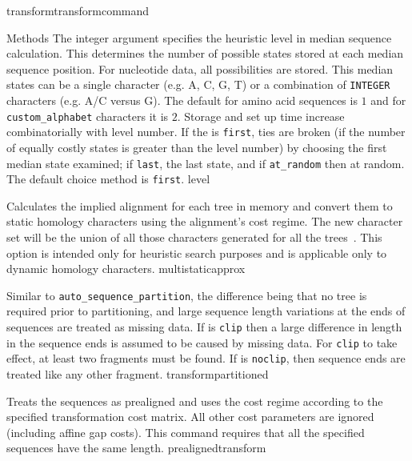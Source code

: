 \begin{command}{transform}{transformcommand}
\begin{arguments}
\begin{argumentgroup}{Methods}
          {The integer argument specifies the heuristic level in median sequence calculation.  
            This determines the number of possible states stored at each median sequence position.  
            For nucleotide data, all possibilities are stored.  This median states can be a single character 
            (e.g. A, C, G, T) or a combination of \texttt{INTEGER}  characters (e.g. A/C versus G).
            The default for amino acid sequences is $1$ and for \texttt{custom\_alphabet} characters 
            it is $2$.  Storage and set up time increase combinatorially with level number. 
            If the \poylident is \texttt{first}, ties are broken (if the number of equally costly states 
            is greater than the level number) by choosing the first median state examined; 
            if \texttt{last}, the last state, and if \texttt{at\_random} then at random.
            The default choice method is \texttt{first}.}
          {level}
                    
            {Calculates the implied alignment for each tree in memory
            and convert them to static homology characters using the alignment's
            cost regime. The new character set will be the union of all those
            characters generated for all the trees~\cite{wheeler1995a}. This option is intended only
            for heuristic search purposes and is applicable only to dynamic homology characters.}
            {multistaticapprox}

            {Similar to \texttt{auto\_sequence\_partition}, the difference being that no tree is
            required prior to partitioning, and large sequence length variations
            at the ends of sequences are treated as missing data. If \poylident is \texttt{clip} then
            a large difference in length in the sequence ends is assumed to be caused by
            missing data. For \texttt{clip} to take effect, at least two fragments must
            be found. If \poylident is \texttt{noclip}, then sequence ends are treated like
            any other fragment.}
            {transformpartitioned}
            
            
                {Treats the sequences as prealigned and uses the
                cost regime according to the specified transformation cost
                matrix. All other cost parameters are ignored (including affine
                gap costs). This command requires that all the specified sequences have the same length.}
                {prealignedtransform}
            

\end{argumentgroup}
\end{arguments}
\end{command}
